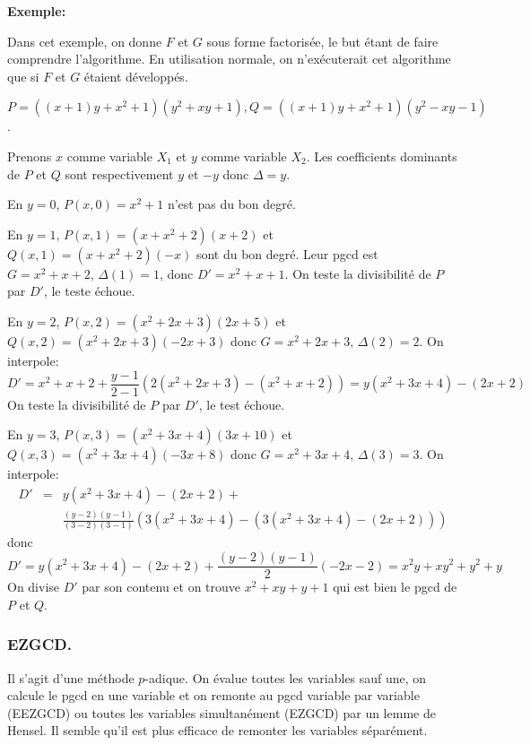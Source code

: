 \documentclass[a4paper,11pt]{article}
\begin{document}
{\bf{Exemple:}}

Dans cet exemple, on donne $F$ et $G$ sous forme factorisée, le but étant de
faire comprendre l'algorithme. En utilisation normale, on n'exécuterait cet
algorithme que si $F$ et $G$ étaient développés.

$P = (( x + 1 ) y + x^2 + 1 ) ( y^2 + x y + 1 ), Q = (( x + 1 ) y +
x^2 + 1 ) ( y^2 - x y - 1 )$.

Prenons $x$ comme variable $X_1$ et $y$ comme variable $X_2$. Les coefficients
dominants de $P$ et $Q$ sont respectivement $y$ et $- y$ donc $\Delta = y$.

En $y = 0$, $P ( x, 0 ) = x^2 + 1$ n'est pas du bon degré.

En $y = 1$, $P ( x, 1 ) = ( x + x^2 + 2 ) ( x + 2 )$ et $Q ( x, 1 ) = ( x +
x^2 + 2 ) ( - x )$ sont du bon degré. Leur pgcd est $G = x^2 + x + 2$, $\Delta
( 1 ) = 1$, donc $D' = x^2 + x + 1$. On teste la divisibilité de $P$ par $D'$,
le teste échoue.

En $y = 2$, $P ( x, 2 ) = ( x^2 + 2 x + 3 ) ( 2 x + 5 )$ et $Q ( x, 2 ) = (
x^2 + 2 x + 3 ) ( - 2 x + 3 )$ donc $G = x^2 + 2 x + 3$, $\Delta ( 2 ) = 2$.
On interpole:
\[ D' = x^2 + x + 2 + \frac{y - 1}{2 - 1} ( 2 ( x^2 + 2 x + 3 ) - ( x^2 + x +
   2 )) = y ( x^2 + 3 x + 4 ) - ( 2 x + 2 ) \]
On teste la divisibilité de $P$ par $D'$, le test échoue.

En $y = 3$, $P ( x, 3 ) = ( x^2 + 3 x + 4 ) ( 3 x + 10 )$ et $Q ( x, 3 ) = (
x^2 + 3 x + 4 ) ( - 3 x + 8 )$ donc $G = x^2 + 3 x + 4$, $\Delta ( 3 ) = 3$.
On interpole:
\begin{eqnarray*}
  D' &= &y ( x^2 + 3 x + 4 ) - ( 2 x + 2 ) + \\
  & & \frac{( y - 2 ) ( y - 1 )}{( 3 - 2
  ) ( 3 - 1 )} \left( 3 ( x^2 + 3 x + 4 ) - ( 3 ( x^2 + 3 x + 4 ) - ( 2 x + 2
  )) \right)
\end{eqnarray*}
donc
\[ D' = y ( x^2 + 3 x + 4 ) - ( 2 x + 2 ) + \frac{( y - 2 ) ( y - 1 )}{2} ( -
   2 x - 2 ) = x^2 y + x y^2 + y^2 + y \]
On divise $D'$ par son contenu et on trouve $x^2 + x y + y + 1$ qui est bien
le pgcd de $P$ et $Q$.

\subsubsection{EZGCD.}

Il s'agit d'une méthode $p$-adique. On évalue toutes les variables sauf une,
on calcule le pgcd en une variable et on remonte au pgcd variable par variable
(EEZGCD) ou toutes les variables simultanément (EZGCD) par un lemme de Hensel.
Il semble qu'il est plus efficace de remonter les variables séparément.
\end{document}
